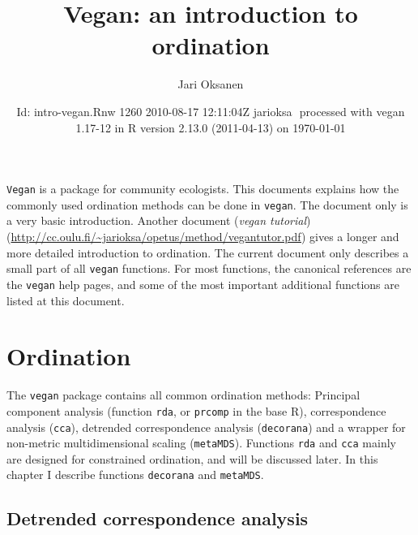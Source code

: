 \documentclass[a4paper,10pt]{amsart}
\title{Vegan: an introduction to ordination}
\author{Jari Oksanen}
\date{$ $Id: intro-vegan.Rnw 1260 2010-08-17 12:11:04Z jarioksa $ $
  processed with vegan
1.17-12
in R version 2.13.0 (2011-04-13) on \today}
\begin{document}


\maketitle

\tableofcontents


\noindent \texttt{Vegan} is a package for community ecologists.  This
documents explains how the commonly used ordination methods can be
done in \texttt{vegan}.  The document only is a very basic
introduction.  Another document (\emph{vegan tutorial})
(\url{http://cc.oulu.fi/~jarioksa/opetus/method/vegantutor.pdf}) gives
a longer and more detailed introduction to ordination.  The
current document only describes a small part of all \texttt{vegan}
functions.  For most functions, the canonical references are the
\texttt{vegan} help pages, and some of the most important additional
functions are listed at this document.

\section{Ordination}

The \texttt{vegan} package contains all common ordination methods:
Principal component analysis (function \texttt{rda}, or
\texttt{prcomp} in the base \textsf{R}), correspondence analysis
(\texttt{cca}), detrended correspondence analysis (\texttt{decorana})
and a wrapper for non-metric multidimensional scaling
(\texttt{metaMDS}).  Functions \texttt{rda} and \texttt{cca} mainly
are designed for constrained ordination, and will be discussed later.
In this chapter I describe functions \texttt{decorana} and
\texttt{metaMDS}.

\subsection{Detrended correspondence analysis}
\end{document}
